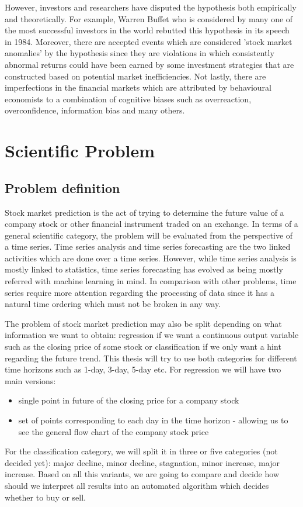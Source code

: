 However, investors and researchers have disputed the hypothesis both empirically and theoretically. For example, Warren Buffet who is considered by many one of the most successful investors in the world rebutted this hypothesis in its speech in 1984.\cite{businessinsiderwarrenbuffet} Moreover, there are accepted events which are considered 'stock market anomalies' by the hypothesis since they are violations in which consistently abnormal returns could have been earned by some investment strategies that are constructed based on potential market inefficiencies. Not lastly, there are imperfections in the financial markets which are attributed by behavioural economists to a combination of cognitive biases such as overreaction, overconfidence, information bias and many others.


\section{Scientific Problem}
\subsection{Problem definition}
Stock market prediction is the act of trying to determine the future value of a company stock or other financial instrument traded on an exchange. In terms of a general scientific category, the problem will be evaluated from the perspective of a time series. Time series analysis and time series forecasting are the two linked activities which are done over a time series. However, while time series analysis is mostly linked to statistics, time series forecasting has evolved as being mostly referred with machine learning in mind. In comparison with other problems, time series require more attention regarding the processing of data since it has a natural time ordering which must not be broken in any way.

The problem of stock market prediction may also be split depending on what information we want to obtain: regression if we want a continuous output variable such as the closing price of some stock or classification if we only want a hint regarding the future trend. This thesis will try to use both categories for different time horizons such as 1-day, 3-day, 5-day etc. For regression we will have two main versions:
\begin{itemize}
    \item single point in future of the closing price for a company stock
    \item set of points corresponding to each day in the time horizon - allowing us to see the general flow chart of the company stock price
\end{itemize}
For the classification category, we will split it in three or five categories (not decided yet): major decline, minor decline, stagnation, minor increase, major increase. Based on all this variants, we are going to compare and decide how should we interpret all results into an automated algorithm which decides whether to buy or sell.

